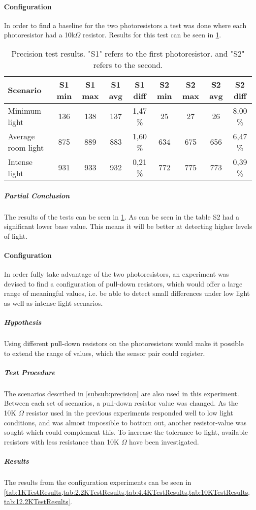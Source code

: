 \paragraph{Configuration}
In order to find a baseline for the two photoresistors a test was done where each photoresistor had a 10k$\Omega$ resistor. Results for this test can be seen in \cref{tab:precisionTestResults}.
  \begin{table}
    \centering
    \begin{tabular}[H!]{m{4.5em} c c c c c c c c}
      Scenario & S1 min & S1 max & S1 avg & S1 diff & S2 min & S2 max & S2 avg & S2 diff \\
      \hline
      Minimum light & 136 & 138 & 137 & 1,47 \% & 25 & 27 & 26 & 8.00 \% \\
      Average room light & 875 & 889 & 883 & 1,60 \%  & 634 & 675 & 656 & 6,47 \% \\
      Intense light & 931 & 933 & 932 & 0,21 \%  & 772 & 775 & 773 & 0,39 \% \\
    \end{tabular}
    \caption{Precision test results. "S1" refers to the first photoresistor. and "S2" refers to the second.}\label{tab:precisionTestResults}
  \end{table}
\subparagraph{Partial Conclusion}
The results of the tests can be seen in \cref{tab:precisionTestResults}. As can be seen in the table S2 had a significant lower base value. This means it will be better at detecting higher levels of light.

\paragraph{Configuration}
In order fully take advantage of the two photoresistors, an experiment was devised to find a configuration of pull-down resistors, which would offer a large range of meaningful values, i.e. be able to detect small differences under low light as well as intense light scenarios.
\subparagraph{Hypothesis}
Using different pull-down resistors on the photoresistors would make it possible to extend the range of values, which the sensor pair could register.
\subparagraph{Test Procedure}
The scenarios described in \cref{subsub:precision} are also used in this experiment. Between each set of scenarios, a pull-down resistor value was changed. As the 10K $\Omega$ resistor used in the previous experiments responded well to low light conditions, and was almost impossible to bottom out, another resistor-value was sought which could complement this. To increase the tolerance to light, available resistors with less resistance than 10K $\Omega$ have been investigated.
\subparagraph{Results}
The results from the configuration experiments can be seen in \cref{tab:1KTestResults,tab:2.2KTestResults,tab:4.4KTestResults,tab:10KTestResults,tab:12.2KTestResults}.

